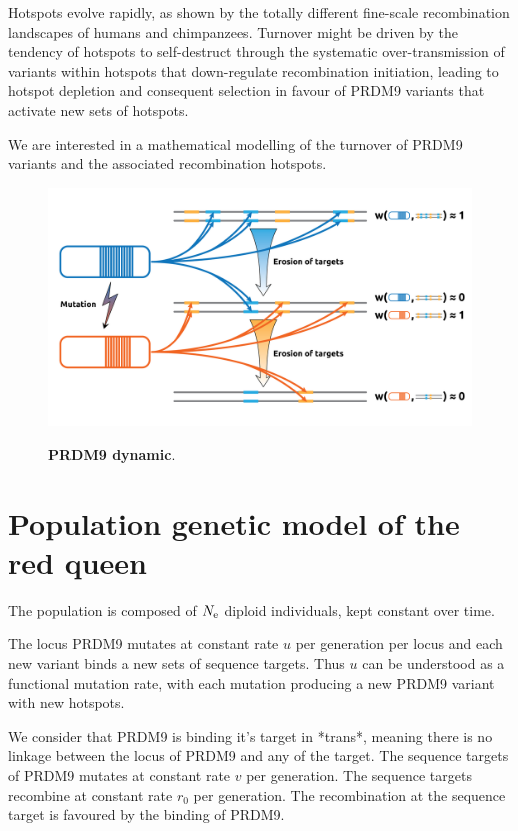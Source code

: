 \documentclass{article}
\begin{document}
Hotspots evolve rapidly, as shown by the totally different fine-scale recombination landscapes of humans and chimpanzees.
Turnover might be driven by the tendency of hotspots to self-destruct through the systematic over-transmission of variants within hotspots that down-regulate recombination initiation, leading to hotspot depletion and consequent 
selection in favour of PRDM9 variants that activate new sets of hotspots.

We are interested in a mathematical modelling of the turnover of PRDM9 variants and the associated recombination hotspots.

	\begin{figure}[H]
	  \centering
       \includegraphics[width=12.0cm]{Images/red-queen.png}\\
		\caption{ \textbf{PRDM9 dynamic}. 
		\label{fig:redqueen}}
	\end{figure}
	
\section{Population genetic model of the red queen}


The population is composed of $N_\mathrm{e}$ diploid individuals, kept constant over time.


The locus PRDM9 mutates at constant rate $u$ per generation per locus and each new variant binds a new sets of sequence targets. Thus $u$ can be understood as a functional mutation rate, with each mutation producing a new PRDM9 variant with new hotspots.


We consider that PRDM9 is binding it's target in *trans*, meaning there is no linkage between the locus of PRDM9 and any of the target. The sequence targets of PRDM9 mutates at constant rate $v$ per generation. The sequence targets recombine at constant rate $r_0$ per generation. The recombination at the sequence target is favoured by the binding of PRDM9.
\end{document}
